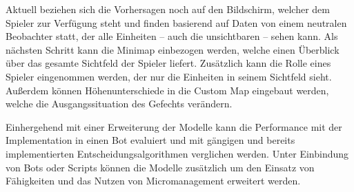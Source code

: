 Aktuell beziehen sich die Vorhersagen noch auf den Bildschirm, welcher dem Spieler zur Verfügung steht und finden basierend auf Daten von einem neutralen Beobachter statt, der alle Einheiten -- auch die unsichtbaren -- sehen kann. Als nächsten Schritt kann die Minimap einbezogen werden, welche einen Überblick über das gesamte Sichtfeld der Spieler liefert. Zusätzlich kann die Rolle eines Spieler eingenommen werden, der nur die Einheiten in seinem Sichtfeld sieht. Außerdem können Höhenunterschiede in die Custom Map eingebaut werden, welche die Ausgangssituation des Gefechts verändern. 

Einhergehend mit einer Erweiterung der Modelle kann die Performance mit der Implementation in einen Bot evaluiert und mit gängigen und bereits implementierten Entscheidungsalgorithmen verglichen werden. Unter Einbindung von Bots oder Scripts können die Modelle zusätzlich um den Einsatz von Fähigkeiten und das Nutzen von Micromanagement erweitert werden. 